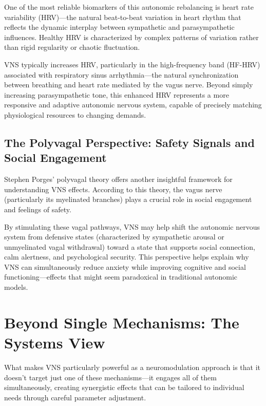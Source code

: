 \documentclass[
  Letterpaper,
]{scrbook}
\begin{document}
One of the most reliable biomarkers of this autonomic rebalancing is
heart rate variability (HRV)---the natural beat-to-beat variation in
heart rhythm that reflects the dynamic interplay between sympathetic and
parasympathetic influences. Healthy HRV is characterized by complex
patterns of variation rather than rigid regularity or chaotic
fluctuation.

VNS typically increases HRV, particularly in the high-frequency band
(HF-HRV) associated with respiratory sinus arrhythmia---the natural
synchronization between breathing and heart rate mediated by the vagus
nerve. Beyond simply increasing parasympathetic tone, this enhanced HRV
represents a more responsive and adaptive autonomic nervous system,
capable of precisely matching physiological resources to changing
demands.

\subsection{The Polyvagal Perspective: Safety Signals and Social
Engagement}\label{the-polyvagal-perspective-safety-signals-and-social-engagement}

Stephen Porges' polyvagal theory offers another insightful framework for
understanding VNS effects. According to this theory, the vagus nerve
(particularly its myelinated branches) plays a crucial role in social
engagement and feelings of safety.

By stimulating these vagal pathways, VNS may help shift the autonomic
nervous system from defensive states (characterized by sympathetic
arousal or unmyelinated vagal withdrawal) toward a state that supports
social connection, calm alertness, and psychological security. This
perspective helps explain why VNS can simultaneously reduce anxiety
while improving cognitive and social functioning---effects that might
seem paradoxical in traditional autonomic models.

\section{Beyond Single Mechanisms: The Systems
View}\label{beyond-single-mechanisms-the-systems-view}

What makes VNS particularly powerful as a neuromodulation approach is
that it doesn't target just one of these mechanisms---it engages all of
them simultaneously, creating synergistic effects that can be tailored
to individual needs through careful parameter adjustment.
\end{document}
